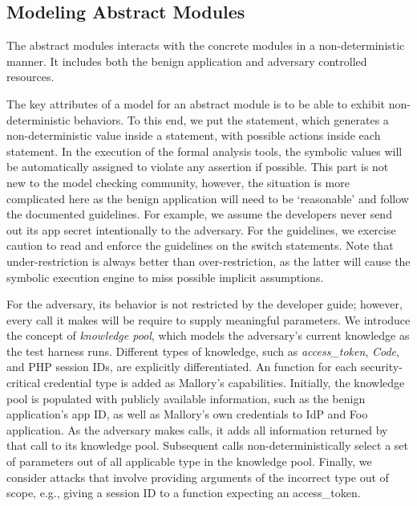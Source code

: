 \subsection{Modeling Abstract Modules}

The abstract modules interacts with the concrete modules in a non-deterministic manner.  It includes both the benign application and adversary controlled resources.  

 The key attributes of a model for an abstract module is to be able to exhibit non-deterministic behaviors.  To this end, we put the  statement, which generates a non-deterministic value inside a  statement, with possible actions inside each  statement.  In the execution of the formal analysis tools, the symbolic values will be automatically assigned to violate any assertion if possible.  This part is not new to the model checking community, however, the situation is more complicated here as the benign application will need to be `reasonable' and follow the documented guidelines.  For example, we assume the developers never send out its app secret intentionally to the adversary.  For the guidelines, we exercise caution to read and enforce the guidelines on the switch statements.  Note that under-restriction is always better than over-restriction, as the latter will cause the symbolic execution engine to miss possible implicit assumptions. 

  For the adversary, its behavior is not restricted by the developer guide; however, every call it makes will be require to supply meaningful parameters.  We introduce the concept of \emph{knowledge pool}, which models the adversary's current knowledge as the test harness runs.  Different types of knowledge, such as \emph{access\_token}, \emph{Code}, and PHP session IDs, are explicitly differentiated.  An  function for each security-critical credential type is added as Mallory's capabilities.  Initially, the knowledge pool is populated with publicly available information, such as the benign application's app ID, as well as Mallory's own credentials to IdP and Foo application.  As the adversary makes calls, it adds all information returned by that call to its knowledge pool.  Subsequent calls non-deterministically select a set of parameters out of all applicable type in the knowledge pool.  Finally, we consider attacks that involve providing arguments of the incorrect type out of scope, e.g., giving a session ID to a function expecting an access\_token.

